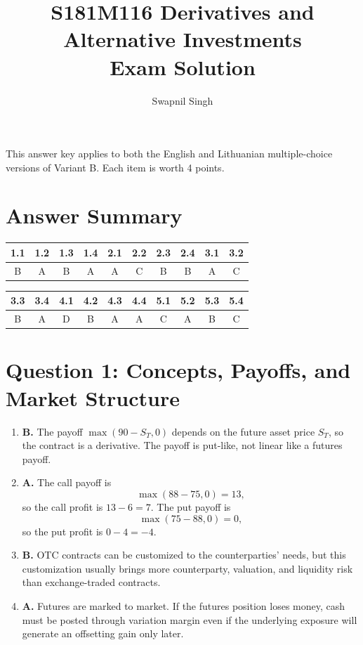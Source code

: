 \documentclass[11pt]{article}
\title{S181M116 Derivatives and Alternative Investments\\
Exam Solution}
\author{Swapnil Singh}
\date{}
\begin{document}
\maketitle

This answer key applies to both the English and Lithuanian multiple-choice
versions of Variant B. Each item is worth 4 points.

\section*{Answer Summary}

\begin{center}
\begin{tabular}{cccccccccc}
\toprule
1.1 & 1.2 & 1.3 & 1.4 & 2.1 & 2.2 & 2.3 & 2.4 & 3.1 & 3.2 \\
\midrule
B & A & B & A & A & C & B & B & A & C \\
\bottomrule
\end{tabular}

\vspace{0.75em}

\begin{tabular}{cccccccccc}
\toprule
3.3 & 3.4 & 4.1 & 4.2 & 4.3 & 4.4 & 5.1 & 5.2 & 5.3 & 5.4 \\
\midrule
B & A & D & B & A & A & C & A & B & C \\
\bottomrule
\end{tabular}
\end{center}

\section*{Question 1: Concepts, Payoffs, and Market Structure}

\begin{enumerate}[label=\textbf{1.\arabic*.}]
    \item \textbf{B.} The payoff $\max(90-S_T,0)$ depends on the future asset
    price $S_T$, so the contract is a derivative. The payoff is put-like, not
    linear like a futures payoff.

    \item \textbf{A.} The call payoff is
    \[
        \max(88-75,0)=13,
    \]
    so the call profit is $13-6=7$. The put payoff is
    \[
        \max(75-88,0)=0,
    \]
    so the put profit is $0-4=-4$.

    \item \textbf{B.} OTC contracts can be customized to the counterparties'
    needs, but this customization usually brings more counterparty, valuation,
    and liquidity risk than exchange-traded contracts.

    \item \textbf{A.} Futures are marked to market. If the futures position loses
    money, cash must be posted through variation margin even if the underlying
    exposure will generate an offsetting gain only later.
\end{enumerate}
\end{document}
